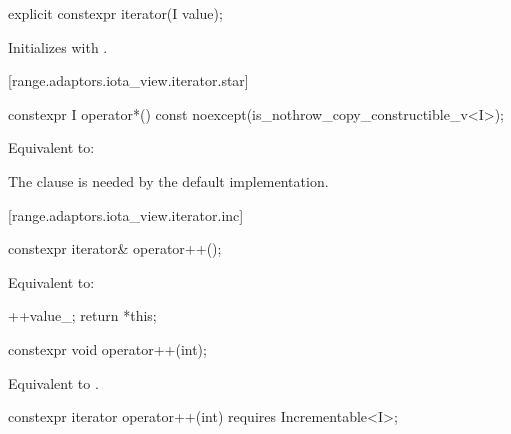\begin{addedblock}
\begin{itemdecl}
explicit constexpr iterator(I value);
\end{itemdecl}

\begin{itemdescr}
\pnum
\effects Initializes  with .
\end{itemdescr}

[range.adaptors.iota_view.iterator.star]{}

\begin{itemdecl}
constexpr I operator*() const noexcept(is_nothrow_copy_constructible_v<I>);
\end{itemdecl}

\begin{itemdescr}
\pnum
\effects Equivalent to: 

\pnum
\begin{note}
The  clause is needed by the default 
implementation.
\end{note}
\end{itemdescr}

[range.adaptors.iota_view.iterator.inc]{}

\begin{itemdecl}
constexpr iterator& operator++();
\end{itemdecl}

\begin{itemdescr}
\pnum
\effects Equivalent to:
\begin{codeblock}
++value_;
return *this;
\end{codeblock}
\end{itemdescr}

\begin{itemdecl}
constexpr void operator++(int);
\end{itemdecl}

\begin{itemdescr}
\pnum
\effects Equivalent to .
\end{itemdescr}

\begin{itemdecl}
constexpr iterator operator++(int) requires Incrementable<I>;
\end{itemdecl}


\end{addedblock}
